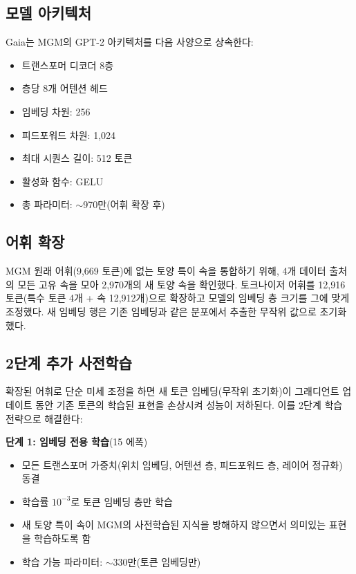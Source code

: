 \documentclass[11pt,a4paper]{article}
\begin{document}
\subsection{모델 아키텍처}

Gaia는 MGM의 GPT-2 아키텍처를 다음 사양으로 상속한다:

\begin{itemize}[leftmargin=1.5em]
    \item 트랜스포머 디코더 8층
    \item 층당 8개 어텐션 헤드
    \item 임베딩 차원: 256
    \item 피드포워드 차원: 1,024
    \item 최대 시퀀스 길이: 512 토큰
    \item 활성화 함수: GELU
    \item 총 파라미터: $\sim$970만(어휘 확장 후)
\end{itemize}

\subsection{어휘 확장}

MGM 원래 어휘(9,669 토큰)에 없는 토양 특이 속을 통합하기 위해, 4개 데이터 출처의 모든 고유 속을 모아 2,970개의 새 토양 속을 확인했다. 토크나이저 어휘를 12,916 토큰(특수 토큰 4개 + 속 12,912개)으로 확장하고 모델의 임베딩 층 크기를 그에 맞게 조정했다. 새 임베딩 행은 기존 임베딩과 같은 분포에서 추출한 무작위 값으로 초기화했다.

\subsection{2단계 추가 사전학습}

확장된 어휘로 단순 미세 조정을 하면 새 토큰 임베딩(무작위 초기화)이 그래디언트 업데이트 동안 기존 토큰의 학습된 표현을 손상시켜 성능이 저하된다. 이를 2단계 학습 전략으로 해결한다:

\textbf{단계 1: 임베딩 전용 학습}(15 에폭)
\begin{itemize}[leftmargin=1.5em]
    \item 모든 트랜스포머 가중치(위치 임베딩, 어텐션 층, 피드포워드 층, 레이어 정규화) 동결
    \item 학습률 $10^{-3}$로 토큰 임베딩 층만 학습
    \item 새 토양 특이 속이 MGM의 사전학습된 지식을 방해하지 않으면서 의미있는 표현을 학습하도록 함
    \item 학습 가능 파라미터: $\sim$330만(토큰 임베딩만)
\end{itemize}
\end{document}

